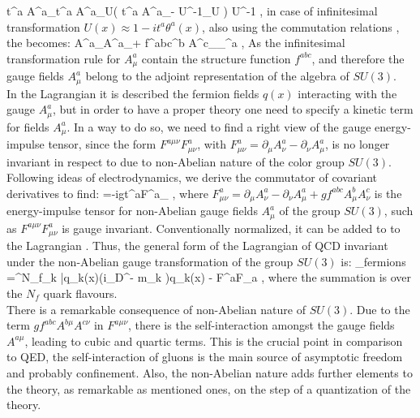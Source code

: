 	\beqa
		\label{qcd_low:color_transform_vector}
		t^a A^a_\mu \rightarrow t^a A^{\prime a}_\mu U\left( t^a A^a_\mu - U^{-1}\partial_\mu U \right) U^{-1} \;,
	\eeqa
	in case of infinitesimal transformation $U(x)\approx 1- it^a\theta^a(x)$, also using the commutation relations \Eq{\ref{qcd_low:commut_relation}}, the \Eq{\ref{qcd_low:color_transform_vector}} becomes:
	\beqa
	\delta A^{\prime a}_\mu \rightarrow A^a_\mu + f^{abc}\theta^b A^c_\mu {}\partial_\mu \theta^a \;,
	\eeqa
	As the infinitesimal transformation rule for $A^a_\mu$ contain the structure function $f^{abc}$, and therefore the gauge fields $A^a_\mu$ belong to the adjoint representation of the algebra of $SU(3)$. \\
	
	In the Lagrangian \Eq{\ref{qcd_low:L_fermions}} it is described the fermion fields $q(x)$ interacting with the gauge $A^a_\mu$, but in order to have a proper theory one need to specify a kinetic term for fields $A^a_\mu$. In a way to do so, we need to find a right view of the gauge energy-impulse tensor, since the form $F^{a\mu\nu}F^a_{\mu\nu}$, with $F^a_{\mu\nu} = \partial_\mu A^a_\nu - \partial_\nu A^a_\mu$, is no longer invariant in respect to \Eq{\ref{qcd_low:color_transform_vector}} due to non-Abelian nature of the color group $SU(3)$. Following ideas of electrodynamics, we derive the commutator of covariant derivatives to find:
	\beqa
		[D_\mu,D_\nu]=-igt^aF^a_{\mu\nu} \;,
	\eeqa	
	where $F^a_{\mu\nu} = \partial_\mu A^a_\nu - \partial_\nu A^a_\mu + gf^{abc}A^b_\mu A^c_\nu$ is the energy-impulse tensor for non-Abelian gauge fields $A^a_\mu$ of the group $SU(3)$, such as $F^{a\mu\nu}F^a_{\mu\nu}$ is gauge invariant. Conventionally normalized, it can be added to to the Lagrangian \Eq{\ref{qcd_low:L_fermions}}. Thus, the general form of the Lagrangian of QCD invariant under the non-Abelian gauge transformation of the group $SU(3)$ is:
	\beqa
		\label{qcd_low:L_QCD}
		_{fermions} =\sum^{N_f}_k \bar{q_k(x)}(i\gamma_\mu D^\mu - m_k )q_k(x) - F^{a\mu\nu}F_{a\mu\nu} \;,
	\eeqa
	where the summation is over the $N_f$ quark flavours. \\
	
	There is a remarkable consequence of non-Abelian nature of $SU(3)$. Due to the term $gf^{abc}A^{b\mu}A^{c\nu}$ in $F^{a\mu\nu}$, there is the self-interaction amongst the gauge fields $A^{a\mu}$, leading to cubic and quartic terms. This is the crucial point in comparison to QED, the self-interaction of gluons is the main source of asymptotic freedom \cite{Gross:1973ju} and probably confinement. Also, the non-Abelian nature adds further elements to the theory, as remarkable as mentioned ones, on the step of a quantization of the theory.
	
